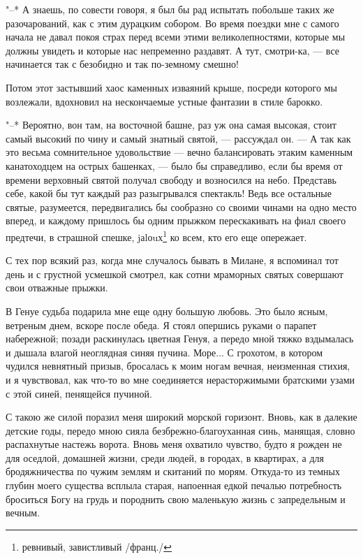 "--* А знаешь, по совести говоря, я был бы рад испытать побольше таких
же разочарований, как с этим дурацким  собором. Во время поездки мне с
самого начала не давал покоя страх перед всеми этими великолепностями,
которые мы  должны увидеть и  которые нас непременно раздавят.  А тут,
смотри-ка, --- все начинается так с безобидно и так по-земному смешно!

Потом этот застывший хаос каменных изваяний крыше, посреди которого мы
возлежали, вдохновил на нескончаемые устные фантазии в стиле барокко.

"--* Вероятно, вон там, на восточной  башне, раз уж она самая высокая,
стоит  самый высокий  по чину  и самый  знатный святой,  --- рассуждал
он.  --- А  так как  это  весьма сомнительное  удовольствие ---  вечно
балансировать  этаким каменным  канатоходцем на  острых башенках,  ---
было бы справедливо, если бы время от времени верховный святой получал
свободу  и возносился  на небо.  Представь себе,  какой бы  тут каждый
раз  разыгрывался спектакль!  Ведь все  остальные святые,  разумеется,
передвигались бы  сообразно со своими  чинами на одно место  вперед, и
каждому  пришлось  бы  одним  прыжком  перескакивать  на  фиал  своего
предтечи,  в  страшной спешке,  jаlоuх\footnote{ревнивый,  завистливый
/франц./} ко всем, кто его еще опережает.

С тех пор всякий раз, когда мне случалось бывать в Милане, я вспоминал
тот день  и с  грустной усмешкой смотрел,  как сотни  мраморных святых
совершают свои отважные прыжки.

В  Генуе  судьба  подарила  мне  еще одну  большую  любовь.  Это  было
ясным, ветреным  днем, вскоре после  обеда. Я стоял опершись  руками о
парапет набережной;  позади раскинулась  цветная Генуя, а  передо мной
тяжко вздымалась  и дышала влагой  неоглядная синяя пучина.  Море... С
грохотом,  в  котором  чудился  невнятный  призыв,  бросалась  к  моим
ногам вечная,  неизменная стихия,  и я чувствовал,  как что-то  во мне
соединяется  нерасторжимыми братскими  узами с  этой синей,  пенящейся
пучиной.

С такою же  силой поразил меня широкий морской горизонт.  Вновь, как в
далекие детские  годы, передо мною сияла  безбрежно-благоуханная синь,
манящая,  словно  распахнутые  настежь  ворота.  Вновь  меня  охватило
чувство, будто я  рожден не для оседлой, домашней  жизни, среди людей,
в  городах,  в квартирах,  а  для  бродяжничества  по чужим  землям  и
скитаний по морям.  Откуда-то из темных глубин  моего существа всплыла
старая, напоенная едкой печалью потребность  броситься Богу на грудь и
породнить свою маленькую жизнь с запредельным и вечным.

